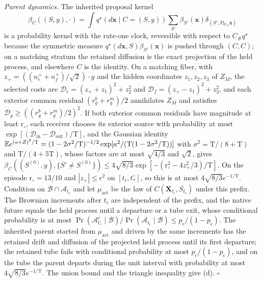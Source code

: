 \emph{Parent dynamics.} The inherited proposal kernel
\[
\beta_C((S,y),\cdot)=\int q^\star(d\mathbf x\mid C=(S,y))\sum_{S'}\beta_{S'}(\mathbf x)
\delta_{(S',P_{W_{S'}}\mathbf x)}
\]
is a probability kernel with the rate-one clock, reversible with respect to
\(C_\#q^\star\) because the symmetric measure
\(q^\star(d\mathbf x,S)\beta_{S'}(\mathbf x)\) is pushed through \((C,C)\); on a
matching stratum the retained diffusion is the exact projection of the held
process, and elsewhere \(C\) is the identity. On a matching fiber, with
\(z_+=((n^+_e+n^+_f)/\sqrt2)\cdot y\) and the hidden coordinates
\(z_1,z_2,z_3\) of \(Z_M\), the selected costs are
\(\mathcal D_e=(z_++z_1)^2+z_2^2\) and \(\mathcal D_f=(z_+-z_1)^2+z_3^2\), and each
exterior common residual \((r^b_g+r^m_g)/2\) annihilates \(Z_M\) and satisfies
\(\mathcal D_g\ge((r^b_g+r^m_g)/2)^2\). If both exterior common residuals have
magnitude at least \(\mathrm r_\circ\), each receiver chooses its exterior
source with probability at most
\(\exp[(\mathcal D_{\mathrm{in}}-\mathcal D_{\mathrm{out}})/\mathrm T]\), and the
Gaussian identity
\(\mathbb E e^{(a+Z)^2/\mathrm T}=(1-2\sigma^2/\mathrm T)^{-1/2}\exp[a^2/(\mathrm T(1-2\sigma^2/\mathrm T))]\)
with \(\sigma^2=\mathrm T/(8+\mathrm T)\) and \(\mathrm T/(4+5\mathrm T)\), whose
factors are at most \(\sqrt{4/3}\) and \(\sqrt2\), gives
\(\beta_C((S^{(0)},y),\{S'\ne S^{(0)}\})\le4\sqrt{8/3}\exp[-(\mathrm r_\circ^2-4z_+^2/3)/\mathrm T]\).
On the episode \(\mathrm r_\circ=13/10\) and \(|z_+|\le\epsilon^2\) on
\([t_\epsilon,t^\circ_*]\), so this is at most \(4\sqrt{8/3} e^{-1/\mathrm T}\).
Condition on \(\mathscr B\cap\mathscr A_{t_\epsilon}\) and let
\(\mu_{\mathrm{act}}\) be the law of \(C(\mathbf X_{t_\epsilon},S_{t_\epsilon})\)
under this prefix. The Brownian increments after \(t_\epsilon\) are independent
of the prefix, and the native future equals the held process until a
departure or a tube exit, whose conditional probability is at most
\(\Pr(\mathscr A^c_{t^\circ_*}\mid\mathscr B)/\Pr(\mathscr A_{t_\epsilon}\mid\mathscr B)
\le p_\epsilon/(1-p_\epsilon)\). The inherited parent started from
\(\mu_{\mathrm{act}}\) and driven by the same increments has the retained drift
and diffusion of the projected held process until its first departure; the
retained tube fails with conditional probability at most
\(p_\epsilon/(1-p_\epsilon)\), and on the tube the parent departs during the
unit interval with probability at most \(4\sqrt{8/3} e^{-1/\mathrm T}\). The
union bound and the triangle inequality give (d). \(\square\)

